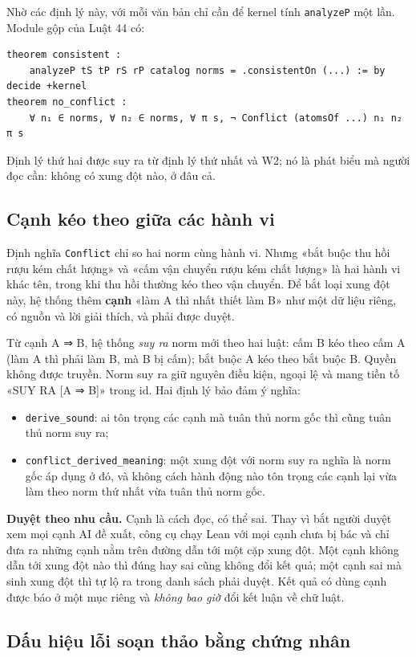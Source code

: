 \documentclass[12pt,a4paper]{article}
\newcommand{\code}[1]{\texttt{#1}}
\newcommand{\term}[1]{\textbf{#1}}
\begin{document}
Nhờ các định lý này, với mỗi văn bản chỉ cần để kernel tính \code{analyzeP} một lần. Module gộp của Luật 44 có:
\begin{Verbatim}
theorem consistent :
    analyzeP tS tP rS rP catalog norms = .consistentOn (...) := by decide +kernel
theorem no_conflict :
    ∀ n₁ ∈ norms, ∀ n₂ ∈ norms, ∀ π s, ¬ Conflict (atomsOf ...) n₁ n₂ π s
\end{Verbatim}
Định lý thứ hai được suy ra từ định lý thứ nhất và W2; nó là phát biểu mà người đọc cần: không có xung đột nào, ở đâu cả.

\subsection{Cạnh kéo theo giữa các hành vi}\label{sec:entail}

Định nghĩa \code{Conflict} chỉ so hai norm cùng hành vi. Nhưng «bắt buộc thu hồi rượu kém chất lượng» và «cấm vận chuyển rượu
kém chất lượng» là hai hành vi khác tên, trong khi thu hồi thường kéo theo vận chuyển. Để bắt loại xung đột này, hệ thống
thêm \term{cạnh} «làm A thì nhất thiết làm B» như một dữ liệu riêng, có nguồn và lời giải thích, và phải được duyệt.

Từ cạnh A ⇒ B, hệ thống \emph{suy ra} norm mới theo hai luật: cấm B kéo theo cấm A (làm A thì phải làm B, mà B bị cấm); bắt
buộc A kéo theo bắt buộc B. Quyền không được truyền. Norm suy ra giữ nguyên điều kiện, ngoại lệ và mang tiền tố «SUY RA [A ⇒
B]» trong id. Hai định lý bảo đảm ý nghĩa:
\begin{itemize}
  \item \code{derive\_sound}: ai tôn trọng các cạnh mà tuân thủ norm gốc thì cũng tuân thủ norm suy ra;
  \item \code{conflict\_derived\_meaning}: một xung đột với norm suy ra nghĩa là norm gốc áp dụng ở đó, và không cách hành động
    nào tôn trọng các cạnh lại vừa làm theo norm thứ nhất vừa tuân thủ norm gốc.
\end{itemize}

\textbf{Duyệt theo nhu cầu.} Cạnh là cách đọc, có thể sai. Thay vì bắt người duyệt xem mọi cạnh AI đề xuất, công cụ chạy Lean
với mọi cạnh chưa bị bác và chỉ đưa ra những cạnh nằm trên đường dẫn tới một cặp xung đột. Một cạnh không dẫn tới xung đột nào
thì đúng hay sai cũng không đổi kết quả; một cạnh sai mà sinh xung đột thì tự lộ ra trong danh sách phải duyệt. Kết quả có
dùng cạnh được báo ở một mục riêng và \emph{không bao giờ} đổi kết luận về chữ luật.

\subsection{Dấu hiệu lỗi soạn thảo bằng chứng nhân}
\end{document}
